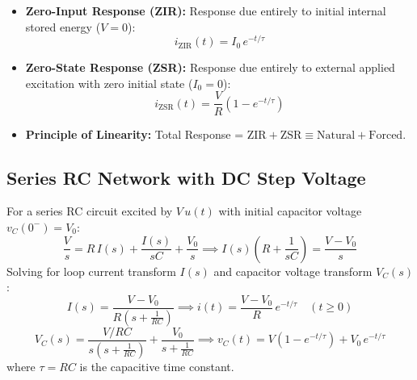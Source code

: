 \documentclass[12pt,a4paper]{article}
\begin{document}
\begin{tcolorbox}[defbox, title={\textbf{Decomposition into Zero-Input and Zero-State Responses}}]
\begin{itemize}[leftmargin=*]
  \item \textbf{Zero-Input Response (ZIR):} Response due entirely to initial internal stored energy ($V = 0$):
  \begin{equation}
    i_{\text{ZIR}}(t) = I_0\,e^{-t/\tau}
  \end{equation}
  \item \textbf{Zero-State Response (ZSR):} Response due entirely to external applied excitation with zero initial state ($I_0 = 0$):
  \begin{equation}
    i_{\text{ZSR}}(t) = \frac{V}{R}\left(1 - e^{-t/\tau}\right)
  \end{equation}
  \item \textbf{Principle of Linearity:} Total Response = $\text{ZIR} + \text{ZSR} \equiv \text{Natural} + \text{Forced}$.
\end{itemize}
\end{tcolorbox}

\subsection{Series RC Network with DC Step Voltage}

For a series RC circuit excited by $V\,u(t)$ with initial capacitor voltage $v_C(0^-) = V_0$:
\begin{equation}
  \frac{V}{s} = R\,I(s) + \frac{I(s)}{sC} + \frac{V_0}{s} \implies I(s)\left(R + \frac{1}{sC}\right) = \frac{V - V_0}{s}
\end{equation}
Solving for loop current transform $I(s)$ and capacitor voltage transform $V_C(s)$:
\begin{equation}
  I(s) = \frac{V - V_0}{R\left(s + \frac{1}{RC}\right)} \implies i(t) = \frac{V - V_0}{R}\,e^{-t/\tau} \quad (t \ge 0)
\end{equation}
\begin{equation}
  V_C(s) = \frac{V/RC}{s\left(s + \frac{1}{RC}\right)} + \frac{V_0}{s + \frac{1}{RC}} \implies v_C(t) = V\left(1 - e^{-t/\tau}\right) + V_0\,e^{-t/\tau}
\end{equation}
where $\tau = RC$ is the capacitive time constant.

\end{document}
